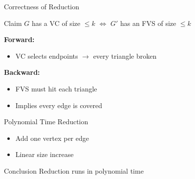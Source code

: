 \documentclass[aspectratio=169]{beamer}
\begin{document}
\begin{frame}{Correctness of Reduction}

	\begin{block}{Claim}
		$G$ has a VC of size $\leq k$
		$\Longleftrightarrow$
		$G'$ has an FVS of size $\leq k$
	\end{block}

	\textbf{Forward:}
	\begin{itemize}
		\item VC selects endpoints $\rightarrow$ every triangle broken
	\end{itemize}

	\textbf{Backward:}
	\begin{itemize}
		\item FVS must hit each triangle
		\item Implies every edge is covered
	\end{itemize}

\end{frame}

\begin{frame}{Polynomial Time Reduction}

	\begin{itemize}
		\item Add one vertex per edge
		\item Linear size increase
	\end{itemize}

	\begin{alertblock}{Conclusion}
		Reduction runs in polynomial time
	\end{alertblock}

\end{frame}
\end{document}
